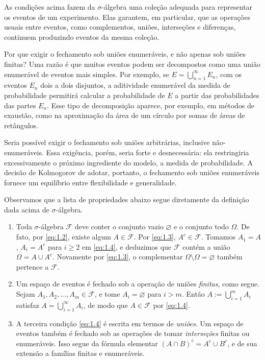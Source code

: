 \documentclass[12pt,portuguese]{article}
\let\ge\geqslant
\theoremstyle{definition}
\begin{document}
As condições acima fazem da \(\sigma\)-álgebra uma coleção adequada para
representar os eventos de um experimento. Elas garantem, em particular, que
as operações usuais entre eventos, como complementos, uniões, interseções e
diferenças, continuem produzindo eventos da mesma coleção.

Por que exigir o fechamento sob uniões enumeráveis, e não apenas sob uniões
finitas? Uma razão é que muitos eventos podem ser decompostos como uma união
enumerável de eventos mais simples. Por exemplo, se
\(E = \bigcup_{n=1}^{\infty} E_n\), com os eventos \(E_n\) dois a dois
disjuntos, a aditividade enumerável da medida de probabilidade permitirá
calcular a probabilidade de \(E\) a partir das probabilidades das partes
\(E_n\). Esse tipo de decomposição aparece, por exemplo, em métodos de
exaustão, como na aproximação da área de um círculo por somas de áreas de
retângulos.

Seria possível exigir o fechamento sob uniões arbitrárias, inclusive
não-enumeráveis. Essa exigência, porém, seria forte e desnecessária: ela
restringiria excessivamente o próximo ingrediente do modelo, a medida de
probabilidade. A decisão de Kolmogorov de adotar, portanto, o fechamento sob uniões enumeráveis
fornece um equilíbrio entre flexibilidade e generalidade.


\bigskip 

Observamos que a lista de propriedades abaixo segue diretamente da definição 
dada acima de $\sigma$-álgebra.


\begin{enumerate}[label=(\alph*), ref=\alph*]
\item Toda $\sigma$-álgebra \(\mathcal{F}\) deve conter o conjunto vazio
\(\varnothing\) e o conjunto todo \(\Omega\). De fato, por \eqref{eq:1.2}, existe algum \(A \in \mathcal{F}\). Por
\eqref{eq:1.3}, \(A^c \in \mathcal{F}\). Tomamos \(A_1 = A\), \(A_i =
A^c\) para \(i \ge 2\) em \eqref{eq:1.4}, e deduzimos que
\(\mathcal{F}\) contém a união \(\Omega = A \cup A^c\). Novamente por
\eqref{eq:1.3}, o complementar \(\Omega \setminus \Omega =
\varnothing\) também pertence a \(\mathcal{F}\).
\item Um espaço de eventos é fechado sob a operação de uniões
\emph{finitas}, como segue. Sejam \(A_1, A_2, \allowbreak \dots, A_m
\in \mathcal{F}\), e tome \(A_i = \varnothing\) para \(i > m\). Então
\(A := \bigcup_{i=1}^m A_i\) satisfaz \(A = \bigcup_{i=1}^\infty
A_i\), de modo que \(A \in \mathcal{F}\) por \eqref{eq:1.4}.
\item A terceira condição \eqref{eq:1.4} é escrita em termos de
\emph{uniões}. Um espaço de eventos também é fechado sob as operações
de tomar \emph{interseções} finitas ou enumeráveis. Isso segue da
fórmula elementar \((A \cap B)^c = A^c \cup B^c\), e de sua extensão
a famílias finitas e enumeráveis.
\end{enumerate}
\end{document}
